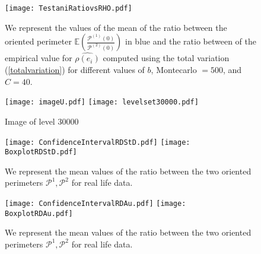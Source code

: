 \documentclass[12pt]{article}
\renewcommand{\hat}{\widehat}
\theoremstyle{Theorem}
\begin{document}
\begin{figure}[H]
  \centering
    {\texttt{[image: TestaniRatiovsRHO.pdf]}}
    \hspace{0.2cm} 
 \caption{We represent the values of the mean of the ratio between the oriented perimeter $\mathbb{E}\left(\frac{\mathcal{P}^{(1)}(0)}{\mathcal{P}^{(2)}(0)}\right)$ in blue and the ratio between of the empirical value for $\hat{\rho(e_i)}$ computed using the total variation (\ref{totalvariation}) for different values of $b$, Montecarlo $= 500$, and $C = 40$.}
\label{fig2}
\end{figure}


\begin{figure}[H]
  \centering
    {\texttt{[image: imageU.pdf]}}
    \hspace{3cm}
    {\texttt{[image: levelset30000.pdf]}}
    \hspace{0.2cm}
 \caption{ Image of level $30000$}
\label{fig2}
\end{figure}

\begin{figure}[H]
  \centering
    {\texttt{[image: ConfidenceIntervalRDStD.pdf]}}
    {\texttt{[image: BoxplotRDStD.pdf]}}
    \hspace{0.2cm}
 \caption{We represent the mean values of the ratio between the two oriented perimeters $\mathcal{P}^{1}, \mathcal{P}^{2}$ for real life data.}
\label{fig2}
\end{figure}


\begin{figure}[H]
  \centering
    {\texttt{[image: ConfidenceIntervalRDAu.pdf]}}
    {\texttt{[image: BoxplotRDAu.pdf]}}
    \hspace{0.2cm}
 \caption{We represent the mean values of the ratio between the two oriented perimeters $\mathcal{P}^{1}, \mathcal{P}^{2}$ for real life data.}
\label{fig2}
\end{figure}


\end{document}

